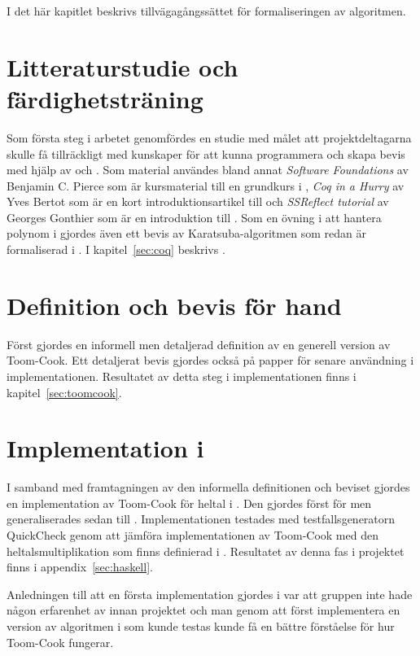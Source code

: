 I det här kapitlet beskrivs tillvägagångssättet för formaliseringen av algoritmen.

\section{Litteraturstudie och färdighetsträning}
Som första steg i arbetet genomfördes en studie med målet att projektdeltagarna
skulle få tillräckligt med kunskaper för att kunna programmera och skapa bevis
med hjälp av \coq{} och \ssr{}. Som material användes bland annat
\emph{Software Foundations} av Benjamin C. Pierce som är kursmaterial till en
grundkurs i \coq{}\cite{pierce2012software}, \emph{Coq in a Hurry} av Yves
Bertot som är en kort introduktionsartikel till \coq{}\cite{bertot2006coq} och
\emph{SSReflect tutorial} av Georges Gonthier som är en introduktion till
\ssr{} \cite{gonthier2009ssreflect}. Som en övning i att hantera polynom i \ssr{}
gjordes även ett bevis av Karatsuba-algoritmen som redan är formaliserad i
\coq{}. I kapitel~\ref{sec:coq} beskrivs \coq.

\section{Definition och bevis för hand}
Först gjordes en informell men detaljerad definition av en generell version av
Toom-Cook. Ett detaljerat bevis gjordes också på papper för senare användning i
implementationen. Resultatet av detta steg i implementationen finns i
kapitel~\ref{sec:toomcook}.

\section{Implementation i \haskell{}}
I samband med framtagningen av den informella definitionen och beviset gjordes
en implementation av Toom-Cook för heltal i \haskell{}. Den gjordes först för
 men generaliserades sedan till . Implementationen testades
med testfallsgeneratorn QuickCheck genom att jämföra implementationen av
Toom-Cook med den heltalsmultiplikation som finns definierad i \haskell{}.
Resultatet av denna fas i projektet finns i appendix~\ref{sec:haskell}.

Anledningen till att en första implementation gjordes i \haskell{} var att
gruppen inte hade någon erfarenhet av \coq{} innan projektet och man genom att
först implementera en version av algoritmen i \haskell{} som kunde testas
kunde få en bättre förståelse för hur Toom-Cook fungerar.

